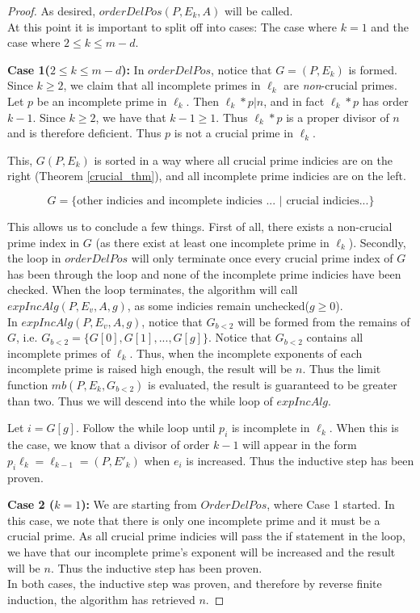 \documentclass[../paper.tex]{subfiles}
\begin{document}
\begin{proof}
As desired, $orderDelPos(P, E_k, A)$ will be called.
\\
 
At this point it is important to split off into cases: The case
where $k = 1$ and the case where $2 \leq k \leq m - d$.

\textbf{Case 1($2 \leq k \leq m - d$):} In $orderDelPos$, notice 
that $G = (P,E_k)$ is formed. Since $k \geq 2$, we claim that
all incomplete primes in $\ell_k$ are \textit{non}-crucial primes.
Let $p$ be an incomplete prime in $\ell_k$. Then $\ell_k * p | n$,
and in fact $\ell_k * p$ has order $k - 1$. Since $k \geq 2$, we
have that $k - 1 \geq 1$. Thus $\ell_k * p$ is a proper divisor of
$n$ and is therefore deficient. Thus $p$ is not a crucial prime in
$\ell_k$.


This, $G(P,E_k)$ is sorted in a way where all crucial prime
indicies are on the right (Theorem {\ref{crucial_thm}}), 
and all incomplete prime indicies are on the left. 

$$ G = \{ \text{other indicies and incomplete indicies ... $|$ crucial
indicies...} \} $$

This allows us to conclude a few things. First of all,  there
exists a non-crucial prime index in $G$ (as there exist at
least one incomplete prime in $\ell_k$). Secondly, the loop in
$orderDelPos$ will only terminate once every crucial prime index of
$G$ has been through the loop and none of the incomplete prime
indicies have been checked. When the loop terminates, the 
algorithm will call $expIncAlg(P,E_v, A, g)$, as some indicies
remain unchecked($g \geq 0$).\\

In $expIncAlg(P,E_v,A, g)$, notice that $G_{b<2}$ will be formed
from the remains of $G$, i.e. $G_{b<2} = \{G[0], G[1], ...,
G[g]\}$. Notice that $G_{b<2}$ contains all incomplete primes
of $\ell_k$. Thus, when the
incomplete exponents of each incomplete prime is raised high
enough,  the result will be $n$. Thus the limit function
$mb(P,E_k, G_{b<2})$ is evaluated, the result is guaranteed to be
greater than two. Thus we will descend into the while loop of
$expIncAlg$. 

Let $i = G[g]$. Follow the while loop until $p_i$ is incomplete in
$\ell_k$. When this is the case, we know that a divisor of order $k -
1$ will appear in the form $p_i \ell_k = \ell_{k-1} = (P, E'_k)$ when
$e_i$ is increased. Thus the inductive step has been proven.

\textbf{Case 2 ($k = 1$):} We are starting from $OrderDelPos$,
where Case 1 started. In this case, we note that there is
only one incomplete prime and it must be a crucial prime.
As all crucial prime indicies will pass the if statement in the 
loop, we have that our incomplete prime's exponent will be 
increased and the result will be $n$. Thus the inductive step has 
been proven.
\\

In both cases, the inductive step was proven, and therefore by
reverse finite induction, the algorithm has retrieved $n$.

\end{proof}
\end{document}

